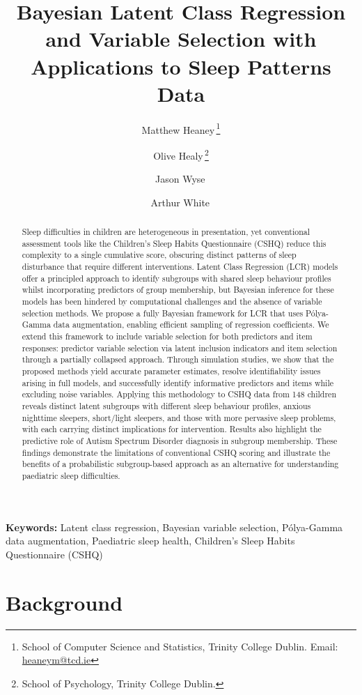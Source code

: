 \documentclass[11pt]{article}
\title{Bayesian Latent Class Regression and Variable Selection with Applications to Sleep Patterns Data}
\author{
  Matthew Heaney\,\orcidlink{0009-0005-4286-1559}\thanks{School of Computer Science and Statistics, Trinity College Dublin. Email: \href{mailto:heaneym@tcd.ie}{heaneym@tcd.ie}} \and
  Olive Healy\,\orcidlink{0000-0002-2119-4129}\thanks{School of Psychology, Trinity College Dublin.} \and
  Jason Wyse\,\orcidlink{0000-0003-1391-7371}\footnotemark[1] \and
  Arthur White\,\orcidlink{0000-0002-7268-5163}\footnotemark[1]
}
\date{} %
\theoremstyle{plain}
\theoremstyle{definition}
\begin{document}
\maketitle

\begin{abstract}
Sleep difficulties in children are heterogeneous in presentation, yet conventional assessment tools like the Children's Sleep Habits Questionnaire (CSHQ) reduce this complexity to a single cumulative  score, obscuring distinct patterns of sleep disturbance that require different interventions. Latent Class Regression (LCR) models offer a principled approach to identify subgroups with shared sleep behaviour profiles whilst incorporating predictors of group membership, but Bayesian inference for these models has been hindered by computational challenges and the absence of variable selection methods. We propose a fully Bayesian framework for LCR that uses Pólya-Gamma data augmentation, enabling efficient sampling of regression coefficients. We extend this framework to include variable selection for both predictors and item responses: predictor variable selection via latent inclusion indicators and item selection through a partially collapsed approach. Through simulation studies, we show that the proposed methods yield accurate parameter estimates, resolve identifiability issues arising in full models, and successfully identify informative predictors and items while excluding noise variables. Applying this methodology to CSHQ data from 148 children reveals distinct latent subgroups with different sleep behaviour profiles, anxious nighttime sleepers, short/light sleepers, and those with more pervasive sleep problems, with each carrying distinct implications for intervention. Results also highlight the predictive role of Autism Spectrum Disorder diagnosis in subgroup membership. These findings demonstrate the limitations of conventional CSHQ scoring and illustrate the benefits of a probabilistic subgroup-based approach as an alternative for understanding paediatric sleep difficulties.
\end{abstract}

\noindent\textbf{Keywords:} Latent class regression, Bayesian variable selection, Pólya-Gamma data augmentation, Paediatric sleep health, Children's Sleep Habits Questionnaire (CSHQ)



\section{Background}
\end{document}
